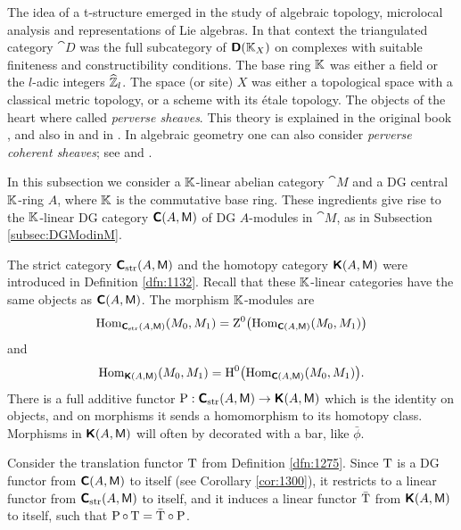 \begin{rem}
The idea of a t-structure emerged in the study of algebraic topology,  
microlocal analysis and representations of Lie algebras. In that context the 
triangulated category $\cat{D}$ was 
the full subcategory of $\boldsymbol{\mathsf{D}}(\mathbb{K}_X)$ on complexes with suitable 
finiteness and constructibility conditions. The base ring $\mathbb{K}$ was either a 
field or the $l$-adic integers $\widehat{\mathbb{Z}}_l$. The space (or site) $X$ was 
either a topological space with a classical metric topology, or
a scheme with its \'etale topology. 
The objects of the heart where called 
{\em perverse sheaves}. This theory is explained in the original book 
\cite{BBD}, and also in \cite{Bor} and in \cite[Chapter X]{KaSc1}. 
In algebraic geometry one can also consider {\em perverse coherent sheaves}; 
see \cite{YeZh2} and \cite{AriBez}. 
\end{rem}




\label{subsec:K-is-triang}

In this subsection we consider a $\mathbb{K}$-linear abelian category $\cat{M}$ and a 
DG central $\mathbb{K}$-ring $A$, where $\mathbb{K}$ is the commutative base ring. These 
ingredients give rise to the $\mathbb{K}$-linear DG category $\boldsymbol{\mathsf{C}}(A, \operatorname{\mathsf{M}})$ of 
DG $A$-modules in $\cat{M}$, as in Subsection \ref{subsec:DGModinM}. 

The strict category $\boldsymbol{\mathsf{C}}_{\mathrm{str}}(A, \operatorname{\mathsf{M}})$ and the 
homotopy category $\boldsymbol{\mathsf{K}}(A, \operatorname{\mathsf{M}})$ were introduced in Definition
\ref{dfn:1132}. Recall that these $\mathbb{K}$-linear categories have the same objects 
as $\boldsymbol{\mathsf{C}}(A, \operatorname{\mathsf{M}})$. The morphism $\mathbb{K}$-modules are 
\[ \operatorname{Hom}_{\boldsymbol{\mathsf{C}}_{\mathrm{str}}(A, \operatorname{\mathsf{M}})} (M_0, M_1) = 
\operatorname{Z}^0 \bigl( \operatorname{Hom}_{\boldsymbol{\mathsf{C}}(A, \operatorname{\mathsf{M}})} (M_0, M_1) \bigr) \]
and 
\[ \operatorname{Hom}_{\boldsymbol{\mathsf{K}}(A, \operatorname{\mathsf{M}})} (M_0, M_1) = 
\operatorname{H}^0 \bigl( \operatorname{Hom}_{\boldsymbol{\mathsf{C}}(A, \operatorname{\mathsf{M}})} (M_0, M_1) \bigr) . \]
There is a full additive functor 
$\operatorname{P} : \boldsymbol{\mathsf{C}}_{\mathrm{str}}(A, \operatorname{\mathsf{M}}) \to \boldsymbol{\mathsf{K}}(A, \operatorname{\mathsf{M}})$ 
which is the identity on objects, and on morphisms it sends a homomorphism to 
its homotopy class. 
Morphisms in $\boldsymbol{\mathsf{K}}(A, \operatorname{\mathsf{M}})$ will often by decorated with a bar, like
$\bar{\phi}$. 

Consider the translation functor $\operatorname{T}$ from  Definition 
\ref{dfn:1275}. Since $\operatorname{T}$ is a DG functor from $\boldsymbol{\mathsf{C}}(A, \operatorname{\mathsf{M}})$ to 
itself (see Corollary \ref{cor:1300}), it restricts to a linear functor
from $\boldsymbol{\mathsf{C}}_{\mathrm{str}}(A, \operatorname{\mathsf{M}})$ to itself, and it induces a linear 
functor $\bar{\operatorname{T}}$ from $\boldsymbol{\mathsf{K}}(A, \operatorname{\mathsf{M}})$ to itself, such that 
$\operatorname{P} \circ \operatorname{T} = \bar{\operatorname{T}} \circ \operatorname{P}$.

